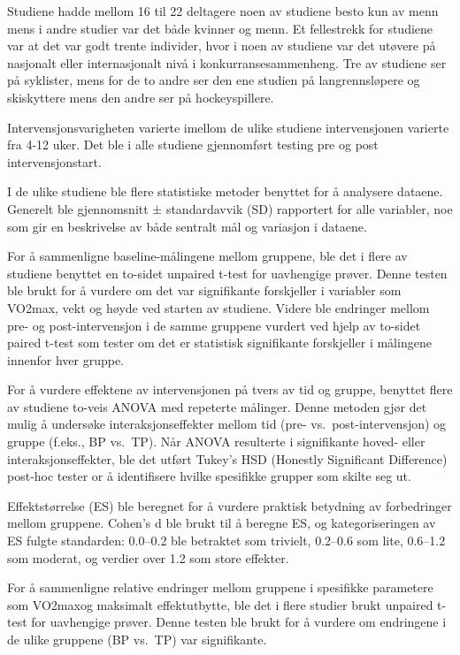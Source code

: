 \documentclass[
  letterpaper,
  DIV=11,
  numbers=noendperiod]{scrreprt}
\begin{document}
Studiene hadde mellom 16 til 22 deltagere noen av studiene besto kun av
menn mens i andre studier var det både kvinner og menn. Et fellestrekk
for studiene var at det var godt trente individer, hvor i noen av
studiene var det utøvere på nasjonalt eller internasjonalt nivå i
konkurransesammenheng. Tre av studiene ser på syklister, mens for de to
andre ser den ene studien på langrennsløpere og skiskyttere mens den
andre ser på hockeyspillere.

Intervensjonsvarigheten varierte imellom de ulike studiene
intervensjonen varierte fra 4-12 uker. Det ble i alle studiene
gjennomført testing pre og post intervensjonstart.

I de ulike studiene ble flere statistiske metoder benyttet for å
analysere dataene. Generelt ble gjennomsnitt ± standardavvik (SD)
rapportert for alle variabler, noe som gir en beskrivelse av både
sentralt mål og variasjon i dataene.

For å sammenligne baseline-målingene mellom gruppene, ble det i flere av
studiene benyttet en to-sidet unpaired t-test for uavhengige prøver.
Denne testen ble brukt for å vurdere om det var signifikante forskjeller
i variabler som VO2max, vekt og høyde ved starten av studiene. Videre
ble endringer mellom pre- og post-intervensjon i de samme gruppene
vurdert ved hjelp av to-sidet paired t-test som tester om det er
statistisk signifikante forskjeller i målingene innenfor hver gruppe.

For å vurdere effektene av intervensjonen på tvers av tid og gruppe,
benyttet flere av studiene to-veis ANOVA med repeterte målinger. Denne
metoden gjør det mulig å undersøke interaksjonseffekter mellom tid (pre-
vs.~post-intervensjon) og gruppe (f.eks., BP vs.~TP). Når ANOVA
resulterte i signifikante hoved- eller interaksjonseffekter, ble det
utført Tukey's HSD (Honestly Significant Difference) post-hoc tester or
å identifisere hvilke spesifikke grupper som skilte seg ut.

Effektstørrelse (ES) ble beregnet for å vurdere praktisk betydning av
forbedringer mellom gruppene. Cohen's d ble brukt til å beregne ES, og
kategoriseringen av ES fulgte standarden: 0.0--0.2 ble betraktet som
trivielt, 0.2--0.6 som lite, 0.6--1.2 som moderat, og verdier over 1.2
som store effekter.

For å sammenligne relative endringer mellom gruppene i spesifikke
parametere som VO2maxog maksimalt effektutbytte, ble det i flere studier
brukt unpaired t-test for uavhengige prøver. Denne testen ble brukt for
å vurdere om endringene i de ulike gruppene (BP vs.~TP) var
signifikante.
\end{document}
